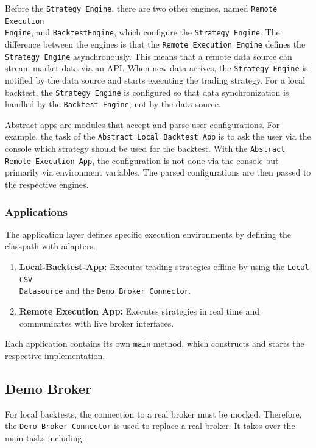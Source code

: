 \noindent
Before the \texttt{Strategy Engine}, there are two other engines, named \texttt{Remote Execution}\\\texttt{Engine}, and \texttt{BacktestEngine}, which configure the \texttt{Strategy Engine}.
The difference between the engines is that the \texttt{Remote Execution Engine} defines the \texttt{Strategy Engine} asynchronously.
This means that a remote data source can stream market data via an API.
When new data arrives, the \texttt{Strategy Engine} is notified by the data source and starts executing the trading strategy.
For a local backtest, the \texttt{Strategy Engine} is configured so that data synchronization is handled by the \texttt{Backtest Engine}, not by the data source.

Abstract apps are modules that accept and parse user configurations.
For example, the task of the \texttt{Abstract Local Backtest App} is to ask the user via the console which strategy should be used for the backtest.
With the \texttt{Abstract Remote Execution App}, the configuration is not done via the console but primarily via environment variables.
The parsed configurations are then passed to the respective engines.

\subsubsection{Applications}

The application layer defines specific execution environments by defining the classpath with adapters.

\begin{enumerate}
    \item \textbf{Local-Backtest-App:} Executes trading strategies offline by using the \texttt{Local CSV }\\\texttt{Datasource} and the \texttt{Demo Broker Connector}.
    \item \textbf{Remote Execution App:} Executes strategies in real time and communicates with live broker interfaces.
\end{enumerate}

\noindent
Each application contains its own \texttt{main} method, which constructs and starts the respective implementation.

\subsection{Demo Broker}

For local backtests, the connection to a real broker must be mocked.
Therefore, the \texttt{Demo Broker Connector} is used to replace a real broker.
It takes over the main tasks including:

